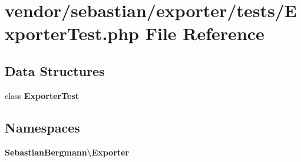 \section{vendor/sebastian/exporter/tests/\+Exporter\+Test.php File Reference}
\label{_exporter_test_8php}
\subsection*{Data Structures}
\begin{DoxyCompactItemize}
\item 
class {\bf Exporter\+Test}
\end{DoxyCompactItemize}
\subsection*{Namespaces}
\begin{DoxyCompactItemize}
\item 
 {\bf Sebastian\+Bergmann\textbackslash{}\+Exporter}
\end{DoxyCompactItemize}
